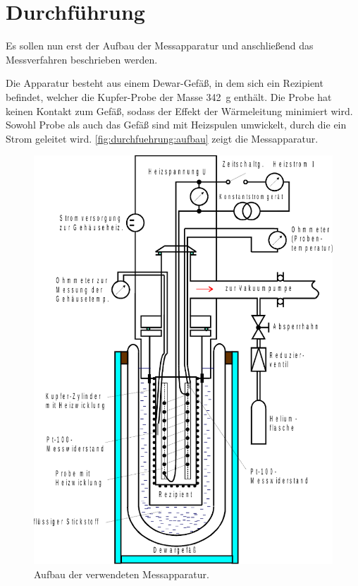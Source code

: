 \section{Durchführung}
\label{sec:durchfuehrung}

    Es sollen nun erst der Aufbau der Messapparatur und anschließend das Messverfahren beschrieben werden.

    Die Apparatur besteht aus einem Dewar-Gefäß,
    in dem sich ein Rezipient befindet,
    welcher die Kupfer-Probe der Masse \SI{342}{\gram} enthält.
    Die Probe hat keinen Kontakt zum Gefäß,
    sodass der Effekt der Wärmeleitung minimiert wird.
    Sowohl Probe als auch das Gefäß sind mit Heizspulen umwickelt,
    durch die ein Strom geleitet wird.
    \autoref{fig:durchfuehrung:aufbau} zeigt die Messapparatur.
    \begin{figure}
        \centering
        \includegraphics[width=\textwidth]{content/img/Abb_1.pdf}
        \caption{Aufbau der verwendeten Messapparatur. \cite{versuchsanleitung}}
        \label{fig:durchfuehrung:aufbau}
    \end{figure}

